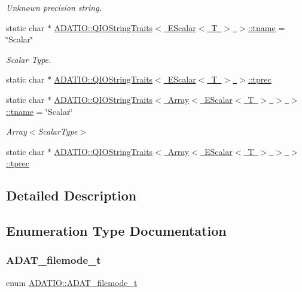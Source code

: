 \begin{DoxyCompactItemize}
\begin{DoxyCompactList}\small\item\em Unknown precision string. \end{DoxyCompactList}\item 
static char $\ast$ \mbox{\hyperlink{group__qio_gaf5e0f914e1c7e78a69472bffe5e470b7}{A\+D\+A\+T\+I\+O\+::\+Q\+I\+O\+String\+Traits$<$ E\+Scalar$<$ T $>$ $>$\+::tname}} = \char`\"{}Scalar\char`\"{}
\begin{DoxyCompactList}\small\item\em Scalar Type. \end{DoxyCompactList}\item 
static char $\ast$ \mbox{\hyperlink{group__qio_ga44058d03fc17a4d1cee98691456d4ae9}{A\+D\+A\+T\+I\+O\+::\+Q\+I\+O\+String\+Traits$<$ E\+Scalar$<$ T $>$ $>$\+::tprec}}
\item 
static char $\ast$ \mbox{\hyperlink{group__qio_gab84af1dfbd36e1ce7eebd1603b371727}{A\+D\+A\+T\+I\+O\+::\+Q\+I\+O\+String\+Traits$<$ Array$<$ E\+Scalar$<$ T $>$ $>$ $>$\+::tname}} = \char`\"{}Scalar\char`\"{}
\begin{DoxyCompactList}\small\item\em Array$<$\+Scalar\+Type$>$ \end{DoxyCompactList}\item 
static char $\ast$ \mbox{\hyperlink{group__qio_ga7ca53c00705c98636d0eb04347851f07}{A\+D\+A\+T\+I\+O\+::\+Q\+I\+O\+String\+Traits$<$ Array$<$ E\+Scalar$<$ T $>$ $>$ $>$\+::tprec}}
\end{DoxyCompactItemize}


\subsection{Detailed Description}


\subsection{Enumeration Type Documentation}
\mbox{\label{group__qio_ga669520ca9003997be838730beef322b4}} 
\subsubsection{\texorpdfstring{ADAT\_filemode\_t}{ADAT\_filemode\_t}}
{\footnotesize\ttfamily enum \mbox{\hyperlink{group__qio_ga669520ca9003997be838730beef322b4}{A\+D\+A\+T\+I\+O\+::\+A\+D\+A\+T\+\_\+filemode\+\_\+t}}}



